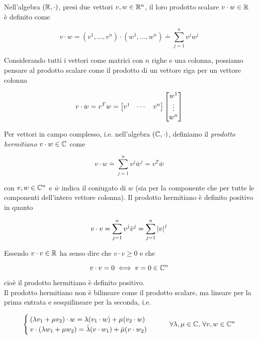 Nell'algebra $ (\mathbb{R},\cdot) $, presi due vettori $ v,w \in \mathbb{R}^{n} $, il loro prodotto scalare $ v \cdot w \in \mathbb{R} $ è definito come

\begin{equation}
	v \cdot w = (v^{1},\dots,v^{n}) \cdot (w^{1},\dots,w^{n}) \doteq \sum_{j=1}^{n} v^{j} w^{j}
\end{equation}

Considerando tutti i vettori come matrici con $ n $ righe e una colonna, possiamo pensare al prodotto scalare come il prodotto di un vettore riga per un vettore colonna

\begin{equation}
	v \cdot w = v^{T} w = %
	\bmqty{ v^{1} & \cdots & v^{n} } \bmqty{ w^{1} \\ \vdots \\ w^{n} }
\end{equation}

Per vettori in campo complesso, i.e. nell'algebra $ (\mathbb{C},\cdot) $, definiamo il \textit{prodotto hermitiano} $ v \cdot w \in \mathbb{C} $ come

\begin{equation}
	v \cdot w \doteq \sum_{j=1}^{n} v^{j} \bar{w}^{j} = v^{T} \bar{w}
\end{equation}

con $ v,w \in \mathbb{C}^{n} $ e $ \bar{w} $ indica il coniugato di $ w $ (sia per la componente che per tutte le componenti dell'intero vettore colonna). Il prodotto hermitiano è definito positivo in quanto

\begin{equation}
	v \cdot v = \sum_{j=1}^{n} v^{j} \bar{v}^{j} = \sum_{j=1}^{n} \abs{v}^{j}
\end{equation}

Essendo $ v \cdot v \in \mathbb{R} $ ha senso dire che $ v \cdot v \geqslant 0 $ e che

\begin{equation}
	v \cdot v = 0 \iff v = 0 \in \mathbb{C}^{n}
\end{equation}

cioè il prodotto hermitiano è definito positivo.\\
Il prodotto hermitiano non è bilineare come il prodotto scalare, ma lineare per la prima entrata e sesquilineare per la seconda, i.e.

\begin{equation}
	\begin{cases}
		(\lambda v_{1} + \mu v_{2}) \cdot w = \lambda (v_{1} \cdot w) + \mu (v_{2} \cdot w) \\
		v \cdot (\lambda w_{1} + \mu w_{2}) = \bar{\lambda} (v \cdot w_{1}) + \bar{\mu} (v \cdot w_{2})
	\end{cases}%
	\qquad \forall \lambda,\mu \in \C, \, \forall v,w \in \C^{n}
\end{equation}

